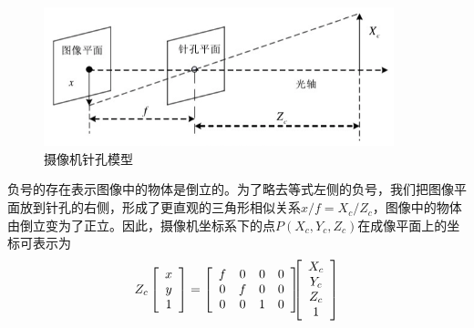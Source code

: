 \begin{figure}[!htb] %
	\centering
	\includegraphics[width=4in]{figures/2_1_pinhole_model}
	\caption{摄像机针孔模型}\label{fig:2_1_pinhole_model}
\end{figure}

负号的存在表示图像中的物体是倒立的。为了略去等式左侧的负号，我们把图像平面放到针孔的右侧，形成了更直观的三角形相似关系$x/f = X_c/Z_c$，图像中的物体由倒立变为了正立。因此，摄像机坐标系下的点$P(X_c, Y_c, Z_c)$在成像平面上的坐标可表示为
%
\begin{eqnarray}\label{eq:2_1_imaging_plane_and_world_transform}
Z_c
\left[\begin{array}{c} x \\ y \\ 1 \end{array} \right]
=
\left[\begin{array}{cccc}
f & 0 & 0 & 0 \\
0 & f & 0 & 0 \\
0 & 0 & 1 & 0
\end{array}
\right]
\hspace{-6pt} %
\left[\begin{array}{c} X_c \\ Y_c \\ Z_c \\ 1 \end{array}\right]
\end{eqnarray}

